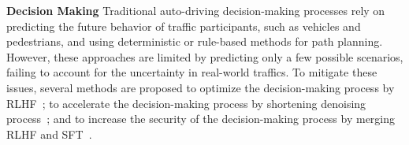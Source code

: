 \noindent\textbf{Decision Making} Traditional auto-driving decision-making processes rely on predicting the future behavior of traffic participants, such as vehicles and pedestrians, and using deterministic or rule-based methods for path planning. However, these approaches are limited by predicting only a few possible scenarios, failing to account for the uncertainty in real-world traffics. To mitigate these issues, several methods are proposed to optimize the decision-making process by RLHF~\citep{huang2024gen}; to accelerate the decision-making process by shortening denoising process~\citep{liao2024diffusiondrive}; and to increase the security of the decision-making process by merging RLHF and SFT~\citep{liu2024ddm}.


